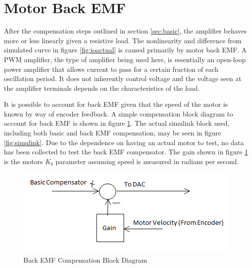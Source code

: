 \section{Motor Back EMF}

After the compensation steps outlined in section \ref{sec:basic}, the amplifier behaves more or less linearly given a resistive load.
The nonlinearity and difference from simulated curve in figure \ref{fig:ioactual} is caused primarily by motor back EMF.
A PWM amplifier, the type of amplifier being used here, is essentially an open-loop power amplifier that allows current to pass for a certain fraction of each oscillation period. 
It does not inherently control voltage and the voltage seen at the amplifier terminals depends on the characteristics of the load.

It is possible to account for back EMF given that the speed of the motor is known by way of encoder feedback.
A simple compensation block diagram to account for back EMF is shown in figure \ref{fig:iobackemfcomp}.
The actual simulink block used, including both basic and back EMF compensation, may be seen in figure \ref{fig:simulink}.
Due to the dependence on having an actual motor to test, no data has been collected to test the back EMF compensator.
The gain shown in figure \ref{fig:iobackemfcomp} is the motors $K_b$ parameter assuming speed is measured in radians per second.

\begin{figure}[ht]
    \centering
    \includegraphics[width=.35\textwidth]{images/BackEMFCompensator.PNG}
    \caption{Back EMF Compensation Block Diagram}
    \label{fig:iobackemfcomp}
\end{figure}

